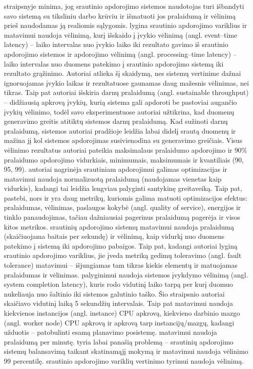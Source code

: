 \documentclass{VUMIFPSbakalaurinis}
\begin{document}
\cite{stonebraker20058} straipsnyje minima, jog srautinio apdorojimo sistemos naudotojas turi išbandyti savo sistemą su tiksliniu darbo krūviu ir išmatuoti jos pralaidumą ir vėlinimą prieš naudodamas ją realiomis sąlygomis. \cite{Karimov2018BenchmarkingDS} lygina srautinio apdorojimo variklius ir matavimui naudoja vėlinimą, kurį išskaido į įvykio vėlinimą (angl. event–time latency) – laiko intervalas nuo įvykio laiko iki rezultato gavimo iš srautinio apdorojimo sistemos ir apdorojimo vėlinimą (angl. processing–time latency) – laiko intervalas nuo duomens patekimo į srautinio apdorojimo sistemą iki rezultato grąžinimo. Autoriai atlieka šį skaidymą, nes sistemų vertinime dažnai ignoruojamas įvykio laikas ir rezultatuose gaunamas daug mažesnis vėlinimas, nei tikras. Taip pat autoriai išskiria darnų pralaidumą (angl. sustainable throughput) – didžiausią apkrovą įvykių, kurią sistema gali apdoroti be pastoviai augančio įvykių vėlinimo, todėl savo eksperimentuose autoriai užtikrina, kad duomenų generavimo greitis atitiktų sistemos darnų pralaidumą. Kad sužinoti darnų pralaidumą, sistemos autoriai pradžioje leidžia labai didelį srautą duomenų ir mažina jį kol sistemos apdorojimas susivienodina su generavimo greičiais. Visus vėlinimo rezultatus autoriai pateikia maksimalaus pralaidumo apdorojimo ir 90\% pralaidumo apdorojimo vidurkiais, minimumais, maksimumais ir kvantiliais (90, 95, 99). \cite{hirzel2014catalog} autoriai nagrinėja srautiniam apdorojimui galimas optimizacijas ir matavimui naudoja normalizuotą pralaidumą (naudojamas vienetas kaip vidurkis), kadangi tai leidžia lengviau palyginti santykinę greitaveiką. Taip pat, \cite{hirzel2014catalog} pastebi, nors ir yra daug metrikų, kuriomis galima matuoti optimizacijos efektus: pralaidumas, vėlinimas, paslaugos kokybė (angl. quality of service), energijos ir tinklo panaudojimas, tačiau dažniausiai pagerinus pralaidumą pagerėja ir visos kitos metrikos. \cite{Qian2016Benchmarking} srautinių apdorojimo sistemų matavimui naudoja pralaidumą (skaičiuojama baitais per sekundę) ir vėlinimą, kaip vidurkį nuo duomens patekimo į sistemą iki apdorojimo pabaigos. Taip pat, kadangi autoriai lyginą srautinio apdorojimo variklius, jie įveda metriką gedimų toleravimo (angl. fault tolerance) matavimui – išjungiamas tam tikras kiekis elementų ir matuojamas pralaidumas ir vėlinimas. \cite{zhang2020heron} palyginimui naudoja sistemos įvykdymo vėlinimą (angl. system completion latency), kuris rodo vidutinį laiko tarpą per kurį duomuo nukeliauja nuo šaltinio iki sistemos galutinio taško. Šio straipsnio autoriai skaičiavo vidutinį laiką 5 sekundžių intervalais. Taip pat \cite{zhang2020heron} matavimui naudoja kiekvienos instancijos (angl. instance) CPU apkrovą, kiekvieno darbinio mazgo (angl. worker node) CPU apkrovą ir apkrovą tarp instancijų/mazgų, kadangi \cite{zhang2020heron} užduotis – patobulinti esamą planavimo posistemę. \cite{dhalion} matavimui naudoja pralaidumą per minutę. \cite{vaquero2018autotuning} tyria labai panašią problemą – srautinių apdorojimo sistemų balansavimą taikant skatinamąjį mokymą ir matavimui naudoja vėlinimo 99 percentilę. \cite{Chintapalli2016Benchmarking} srautinio apdorojimo variklių vertinimo tyrimui naudoja vėlinimą.
\end{document}

